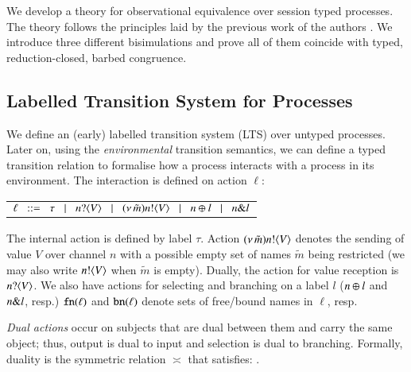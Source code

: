 \noi We develop a theory for observational equivalence over
session typed \HOp processes. The theory follows the principles
laid by the previous work of the authors
\cite{KYHH2015,KY2015}.
We introduce three different bisimulations and prove
all of them coincide with typed, reduction-closed,
barbed congruence. 

\subsection{Labelled Transition System for Processes}\label{ss:lts}
\noi We define an (early) labelled transition system (LTS) over
untyped processes. 
Later on, using the \emph{environmental} transition semantics, 
we can define a typed transition relation to formalise 
how a process interacts with a process in its environment. The interaction
is defined on action $\ell$:
\begin{center}
\begin{tabular}{l}
	$\ell	\;\;::=\;\;   \tau 
		\;\;\;|\;\;\;	n ? \langle V \rangle 
		\;\;\;|\;\;\;	(\nu\, \tilde{m}) n ! \langle V \rangle
		\;\;\;|\;\;\;	n \oplus l 
		\;\;\;|\;\;\;	n \& l $
\end{tabular}
\end{center}
\noi The internal action is defined by label $\tau$.
Action $(\nu\, \tilde{m}) n ! \langle V \rangle$ denotes the sending of value $V$
over channel $n$ with
a possible empty set of names $\tilde{m}$ being restricted
(we may also write $n ! \langle V \rangle$ when $\tilde{m}$ is empty).
Dually, the action for value reception is 
$n ? \langle V \rangle$.
We also have actions for selecting 
and branching on
a label $l$ ($n \oplus l$ and $n \& l$, resp.)
$\mathtt{fn}(\ell)$ and $\mathtt{bn}(\ell)$ denote 
 sets of free/bound names in $\ell$, resp.

\emph{Dual actions} %
occur on subjects that are dual between them and carry the same
object; thus, output is dual to input and 
selection is dual to branching.
Formally, duality 
is the symmetric relation $\asymp$ that satisfies:
.
%
%
\smallskip

